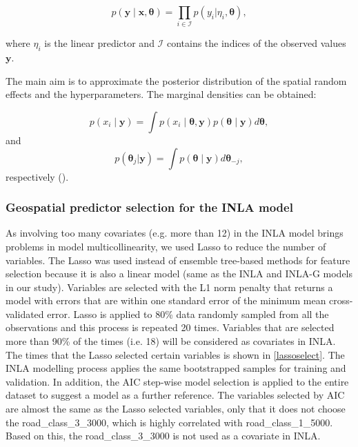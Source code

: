 \documentclass{article}
\begin{document}
\begin{equation} \label{eqn:eq6}
p(\boldsymbol{y}\mid \boldsymbol{x},\boldsymbol{\theta}) =\prod_{i\in \mathcal{I}} p(y_i|\eta_i,\boldsymbol{\theta}),
\end{equation}

where $\eta_{i}$ is the linear predictor and $\mathcal{I}$ contains the indices of the observed values $\boldsymbol{y}$.  

The main aim is to approximate the posterior distribution of the spatial random effects and the hyperparameters. The marginal densities can be obtained:

\begin{equation} \label{eqn:eq7}
p(x_i \mid \boldsymbol{y}) = \int p(x_i \mid \boldsymbol{\theta},\boldsymbol{y})  p(\boldsymbol{\theta} \mid \boldsymbol{y}) d\boldsymbol{\theta},
\end{equation}
and
\begin{equation} \label{eqn:eq8}
p(\boldsymbol{\theta}_j|\boldsymbol{y}) = \int p(\boldsymbol{\theta} \mid \boldsymbol{y})  d\boldsymbol{\theta}_{-j},
\end{equation}
respectively (\cite{lindgren2015bayesian, krainski2018advanced}). \\

 



\subsubsection{Geospatial predictor selection for the INLA model} 

As involving too many covariates (e.g. more than 12) in the INLA model brings problems in model multicollinearity, we used Lasso to reduce the number of variables. The Lasso was used instead of ensemble tree-based methods for feature selection because it is also a linear model (same as the INLA and INLA-G models in our study). Variables are selected with the L1 norm penalty that returns a model with errors that are within one standard error of the minimum mean cross-validated error. Lasso is applied to 80\% data randomly sampled from all the observations and this process is repeated  20 times. Variables that are selected more than 90\% of the times (i.e. 18) will be considered as covariates in INLA. The times that the Lasso selected certain variables is shown in \cref{lassoselect}. The INLA modelling process applies the same bootstrapped samples for training and validation.  In addition, the AIC step-wise model selection is applied to the entire dataset to suggest a model as a further reference. The variables selected by AIC are almost the same as the Lasso selected variables, only that it does not choose the road\_class\_3\_3000, which is highly correlated with  road\_class\_1\_5000. Based on this, the road\_class\_3\_3000 is not used as a covariate in INLA.  
\end{document}
